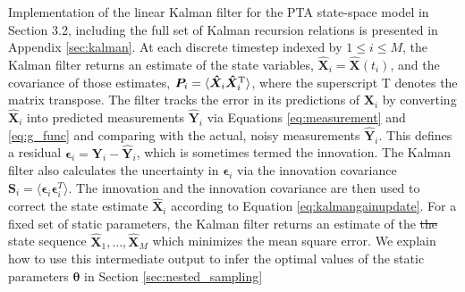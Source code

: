 \documentclass[fleqn,usenatbib,useAMS]{mnras}
\providecommand{\DIFdel}[1]{{\protect\color{red}\sout{#1}}}                      %
\providecommand{\DIFdelbegin}{} %
\providecommand{\DIFdelend}{} %
\newcommand{\DIFscaledelfig}{0.5}
\newlength{\DIFdelgraphicswidth} %
\newlength{\DIFdelgraphicsheight} %
\newcommand{\DIFdelincludegraphics}[2][]{%
\sbox{\DIFdelgraphicsbox}{\DIFOincludegraphics[#1]{#2}}%
\settoboxwidth{\DIFdelgraphicswidth}{\DIFdelgraphicsbox} %
\settoboxtotalheight{\DIFdelgraphicsheight}{\DIFdelgraphicsbox} %
\scalebox{\DIFscaledelfig}{%
\parbox[b]{\DIFdelgraphicswidth}{\usebox{\DIFdelgraphicsbox}\\[-\baselineskip] \rule{\DIFdelgraphicswidth}{0em}}\llap{\resizebox{\DIFdelgraphicswidth}{\DIFdelgraphicsheight}{%
\setlength{\unitlength}{\DIFdelgraphicswidth}%
\begin{picture}(1,1)%
\thicklines\linethickness{2pt} %
{\color[rgb]{1,0,0}\put(0,0){\framebox(1,1){}}}%
{\color[rgb]{1,0,0}\put(0,0){\line( 1,1){1}}}%
{\color[rgb]{1,0,0}\put(0,1){\line(1,-1){1}}}%
\end{picture}%
}\hspace*{3pt}}} %
} %
\DeclareRobustCommand{\DIFdelbegin}{\DIFOdelbegin \let\includegraphics\DIFdelincludegraphics} %
\DeclareRobustCommand{\DIFdelend}{\DIFOaddend \let\includegraphics\DIFOincludegraphics} %
\begin{document}
Implementation of the linear Kalman filter for the PTA state-space model in Section 3.2, including the full set of Kalman recursion relations is presented in Appendix \ref{sec:kalman}. At each discrete timestep indexed by $ 1 \leq i  \leq M$, the Kalman filter returns an estimate of the state variables, $\hat{\boldsymbol{X}}_i = \hat{\boldsymbol{X}}(t_i)$, and the covariance of those estimates, ${\boldsymbol{P}}_i = \langle {\boldsymbol{\hat X}}_i {\boldsymbol{\hat X}}_i^{\rm T} \rangle$, where the superscript T denotes the matrix transpose. The filter tracks the error in its predictions of $\boldsymbol{X}_i$ by converting ${\boldsymbol{\hat X}}_i$ into predicted measurements ${\boldsymbol{\hat Y}}_i$ via Equations \eqref{eq:measurement} and \eqref{eq:g_func} and comparing with the actual, noisy measurements ${\boldsymbol{\hat Y}}_i$. This defines a residual $\boldsymbol{\epsilon}_i = \boldsymbol{Y}_i  - \hat{\boldsymbol{Y}}_i$, which is sometimes termed the innovation. The Kalman filter also calculates the uncertainty in $\boldsymbol{\epsilon}_i$ via the innovation covariance $\boldsymbol{S}_i = \langle \boldsymbol{\epsilon}_i \boldsymbol{\epsilon}_i^{T} \rangle$. The innovation and the innovation covariance are then used to correct the state estimate ${\boldsymbol{\hat X}}_i$ according to Equation \eqref{eq:kalmangainupdate}. For a fixed set of static parameters, the Kalman filter returns an estimate of the \DIFdelbegin \DIFdel{the }\DIFdelend state sequence ${\boldsymbol {\hat X}}_1, \dots , {\boldsymbol{\hat X}}_M$ which minimizes the mean square error. We explain how to use this intermediate output to infer the optimal values of the static parameters ${\boldsymbol{\theta}}$ in Section \ref{sec:nested_sampling} \newline 
\end{document}
